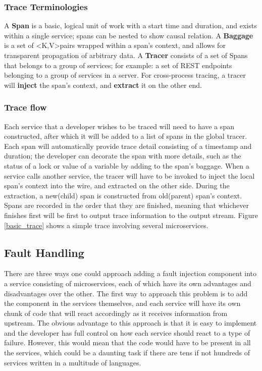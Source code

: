 \subsubsection{Trace Terminologies}
A \textbf{Span} is a basic, logical unit of work with a start time and duration, and exists within 
a single service; spans can be nested to show causal relation. A \textbf{Baggage} is a set of \textless K,V\textgreater pairs wrapped within a span's context, and allows for transparent propagation of arbitrary data. A \textbf{Tracer} consists of a set of Spans that belongs to a group of services; for example: a set of REST endpoints belonging to a group of services in a server. For cross-process tracing, a tracer will \textbf{inject} the span's context, and \textbf{extract} it on the other end.



\subsubsection{Trace flow}
Each service that a developer wishes to be traced will need to have a span constructed, after which it
will be added to a list of spans in the global tracer. Each span will automatically provide trace detail consisting of a timestamp and duration; the developer can decorate the span with more details, such as the status of a lock or value of a variable by adding to the span's baggage. When a service calls another service,
the tracer will have to be invoked to inject the local span's context into the wire, and extracted on the other side. During the extraction, a new(child) span is constructed from old(parent) span's context. Spans are recorded in the order that they are finished, meaning that whichever finishes first will be first to output trace information to the output stream. Figure \ref{basic_trace} shows a simple trace involving several microservices\cite{opentracing:doc}.


\subsection{Fault Handling}
There are three ways one could approach adding a fault injection component into a service consisting of
microservices, each of which have its own advantages and disadvantages over the other. The first way to approach this problem is to add the component in the services themselves, and each service will have its own chunk of code that will react accordingly as it receives information from upstream. The obvious advantage to this approach is that it is easy to implement and the developer has full control on how each service should react to a type of failure. However, this would mean that the code would have to be present in all the services, which could be a daunting task if there are tens if not hundreds of services written in a multitude of languages.

